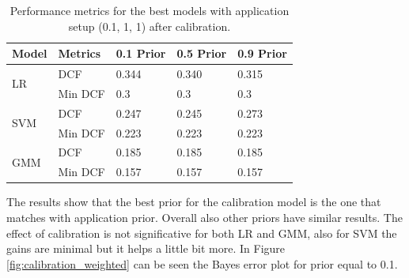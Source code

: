 \documentclass{article}
\begin{document}
\begin{table}
    \centering
    \begin{tabularx}{\textwidth}{llXXX}
        \toprule
        \textbf{Model} & \textbf{Metrics} & \textbf{0.1 Prior} & \textbf{0.5 Prior} & \textbf{0.9 Prior} \\
        \midrule
        \multirow{2}{*}{LR} & DCF & 0.344 & 0.340 & 0.315 \\
                            & Min DCF & 0.3 & 0.3 & 0.3 \\
        \midrule
        \multirow{2}{*}{SVM} & DCF & 0.247 & 0.245 & 0.273 \\
                             & Min DCF & 0.223 & 0.223 & 0.223 \\
        \midrule
        \multirow{2}{*}{GMM} & DCF & 0.185 & 0.185 & 0.185 \\
                             & Min DCF & 0.157 & 0.157 & 0.157 \\
        \bottomrule
    \end{tabularx}
    \caption{Performance metrics for the best models with application setup (0.1, 1, 1) after calibration.}
    \label{tab:calibration_weighted}
\end{table}

The results show that the best prior for the calibration model is the one that matches with application prior. Overall also other priors have similar results. The effect of calibration is not significative for both LR and GMM, also for SVM the gains are minimal but it helps a little bit more. In Figure \ref{fig:calibration_weighted} can be seen the Bayes error plot for prior equal to 0.1.
\end{document}

